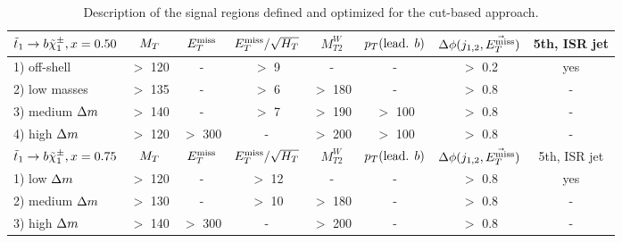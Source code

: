 \begin{table}[!ht]
{\begin{center}
\begin{tabular}{|l|ccccccc|}
    \hline
    $\tilde{t}_1 \rightarrow b\tilde{\chi}_1^\pm, x=0.50$     & $M_T$     & $E_T^\text{miss}$    & $E_T^\text{miss}/\sqrt{H_T}$ & $M_{T2}^W$ & $p_T(\text{lead. }b)$ & $\Delta\phi(j_{1,2},\vec{E_T^\text{miss}})$ & 5th, ISR jet  \\
    \hline
    1) off-shell        &  $>$ 120  &   -      &  $>$  9         &    -       & -                     &  $>$ 0.2      & yes           \\
    2) low masses       &  $>$ 135  &   -      &  $>$  6         & $>$ 180    & -                     &  $>$ 0.8      & -             \\
    3) medium $\Delta m$ &  $>$ 140  &   -      &  $>$  7         & $>$ 190    & $>$ 100               &  $>$ 0.8      & -             \\
    4) high   $\Delta m$ &  $>$ 120  & $>$ 300  &   -             & $>$ 200    & $>$ 100               &  $>$ 0.8      & -             \\
    \hline
    $\tilde{t}_1 \rightarrow b\tilde{\chi}_1^\pm, x=0.75$   & $M_T$     & $E_T^\text{miss}$    & $E_T^\text{miss}/\sqrt{H_T}$ & $M_{T2}^W$ & $p_T(\text{lead. }b)$ & $\Delta\phi(j_{1,2},\vec{E_T^\text{miss}})$ & 5th, ISR jet  \\
    \hline
    1) low    $\Delta m$ &  $>$ 120  &   -      &  $>$  12        &     -      &      -                &  $>$ 0.8      & yes           \\
    2) medium $\Delta m$ &  $>$ 130  &   -      &  $>$  10        &  $>$ 180   &      -                &  $>$ 0.8      & -             \\
    3) high   $\Delta m$ &  $>$ 140  & $>$ 300  &    -            &  $>$ 200   &      -                &  $>$ 0.8      & -             \\
    \hline
    \end{tabular}
\caption{Description of the signal regions defined and optimized for the cut-based approach. \label{tab:cutAndCountCuts}}
\end{center}}
\end{table}


